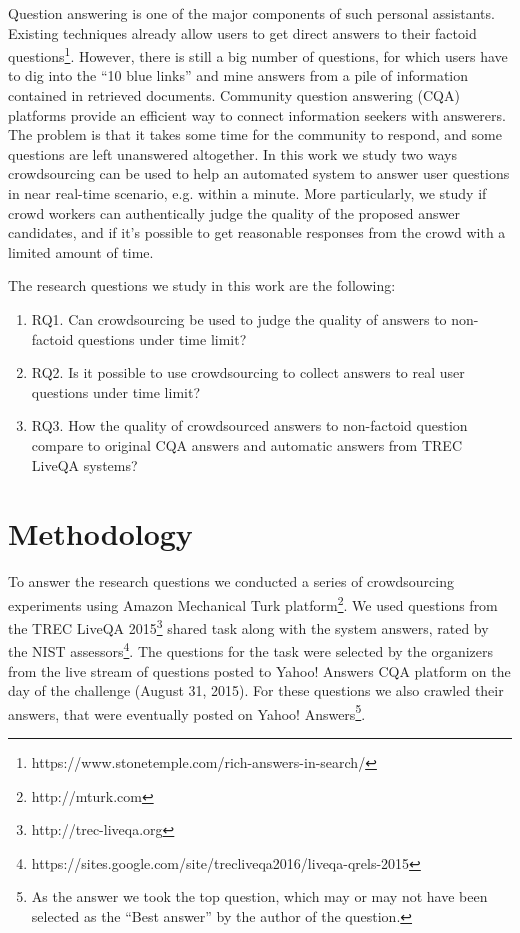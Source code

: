 \documentclass[11pt,letterpaper]{article}
\begin{document}
Question answering is one of the major components of such personal assistants.
Existing techniques already allow users to get direct answers to their factoid questions\footnote{https://www.stonetemple.com/rich-answers-in-search/}.
However, there is still a big number of questions, for which users have to dig into the ``10 blue links'' and mine answers from a pile of information contained in retrieved documents.
Community question answering (CQA) platforms provide an efficient way to connect information seekers with answerers.
The problem is that it takes some time for the community to respond, and some questions are left unanswered altogether.
In this work we study two ways crowdsourcing can be used to help an automated system to answer user questions in near real-time scenario, e.g. within a minute.
More particularly, we study if crowd workers can authentically judge the quality of the proposed answer candidates, and if it's possible to get reasonable responses from the crowd with a limited amount of time.

The research questions we study in this work are the following:
\begin{enumerate}
\item RQ1. Can crowdsourcing be used to judge the quality of answers to non-factoid questions under time limit?
\item RQ2. Is it possible to use crowdsourcing to collect answers to real user questions under time limit?
\item RQ3. How the quality of crowdsourced answers to non-factoid question compare to original CQA answers and automatic answers from TREC LiveQA systems?
\end{enumerate}


\section{Methodology}
\label{sec:methodology}

To answer the research questions we conducted a series of crowdsourcing experiments using Amazon Mechanical Turk platform\footnote{http://mturk.com}.
We used questions from the TREC LiveQA 2015\footnote{http://trec-liveqa.org} shared task along with the system answers, rated by the NIST assessors\footnote{https://sites.google.com/site/trecliveqa2016/liveqa-qrels-2015}.
The questions for the task were selected by the organizers from the live stream of questions posted to Yahoo! Answers CQA platform on the day of the challenge (August 31, 2015).
For these questions we also crawled their answers, that were eventually posted on Yahoo! Answers\footnote{As the answer we took the top question, which may or may not have been selected as the ``Best answer'' by the author of the question.}.
\end{document}
